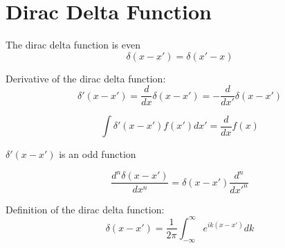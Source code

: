 \chapter{Dirac Delta Function}

The dirac delta function is even
\begin{equation}
	\delta(x-x') = \delta(x'-x)
\end{equation}

Derivative of the dirac delta function:
\begin{equation}
	\delta'(x-x') = \frac{d}{dx}\delta(x-x') = - \frac{d}{dx'}\delta(x-x')
\end{equation}

\begin{equation}
	\int \delta'(x-x')f(x')dx' = \frac{d}{dx} f(x)
\end{equation}

$\delta'(x-x')$ is an odd function

\begin{equation}
	\frac{d^n\delta(x-x')}{dx^n} = \delta(x-x')\frac{d^n}{dx'^n}
\end{equation}

Definition of the dirac delta function:
\begin{equation}
	\delta(x-x') = \frac{1}{2\pi} \int_{-\infty}^{\infty} e^{ik(x-x')}dk
\end{equation}